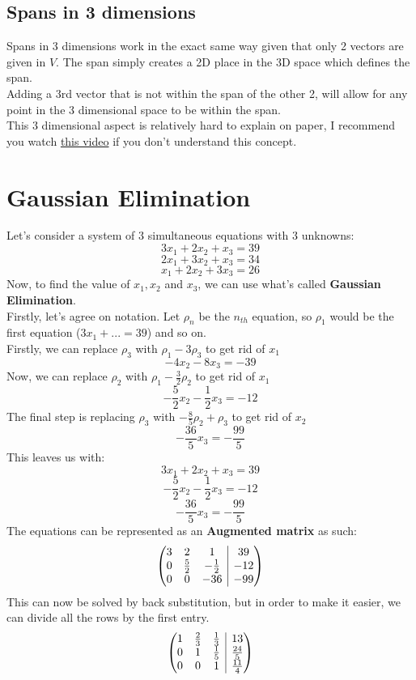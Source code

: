 \documentclass[table]{article}
\makeatletter
\theoremstyle{definition}
\newenvironment{amatrix}[1]{%
  \left(\begin{array}{@{}*{#1}{c}|c@{}}
}{%
  \end{array}\right)
}
\makeatother
\begin{document}
  \subsection{Spans in 3 dimensions}
  Spans in 3 dimensions work in the exact same way given that only 2 vectors are given in $V$. The span simply creates a 2D place in the 3D space which defines the span. \\
  Adding a 3rd vector that is not within the span of the other 2, will allow for any point in the 3 dimensional space to be within the span. \\
  This 3 dimensional aspect is relatively hard to explain on paper, I recommend you watch \href{https://youtu.be/k7RM-ot2NWY?t=357}{this video} if you don't understand this concept.

  \section{Gaussian Elimination}
  Let's consider a system of 3 simultaneous equations with 3 unknowns:
  \[3x_1+2x_2+x_3 = 39 \]
 \[2x_1+3x_2+x_3 = 34 \]
 \[x_1+2x_2+3x_3 = 26 \]
 Now, to find the value of $x_1, x_2$ and $x_3$, we can use what's called \textbf{Gaussian Elimination}. \\
 Firstly, let's agree on notation. Let $\rho_n$ be the $n_{th}$ equation, so $\rho_1$ would be the first equation ($3x_1 + ... = 39$) and so on. \\
  Firstly, we can replace $\rho_3$ with $\rho_1 - 3\rho_3$ to get rid of $x_1$
  \[
    -4x_2 - 8x_3 = -39
  \]
  Now, we can replace $\rho_2$ with $\rho_1 - \frac{3}{2} \rho_2$ to get rid of $x_1$
  \[
    -\frac{5}{2}x_2 - \frac{1}{2}x_3 = -12
  \]
  The final step is replacing $\rho_3$ with $-\frac{8}{5}\rho_2 + \rho_3$ to get rid of $x_2$
  \[
    -\frac{36}{5}x_3 = -\frac{99}{5}
  \]
  This leaves us with:
  \[ 3x_1+2x_2+x_3=39 \]
  \[-\frac{5}{2}x_2 - \frac{1}{2}x_3 = -12\]
\[
    -\frac{36}{5}x_3 = -\frac{99}{5}
  \]
  The equations can be represented as an \textbf{Augmented matrix} as such:
  \[
    \begin{amatrix}{3}
      3 & 2 & 1 & 39 \\
      0 & \frac{5}{2} & -\frac{1}{2} & -12 \\
      0 & 0 & -36 & -99 \\
    \end{amatrix}
  \]
  This can now be solved by back substitution, but in order to make it easier, we can divide all the rows by the first entry.
  \[\begin{amatrix}{3}
    1 & \frac{2}{3} & \frac{1}{3} & 13 \\
    0 & 1 & \frac{1}{5} & \frac{24}{5} \\
    0 & 0 & 1 & \frac{11}{4} \\
  \end{amatrix} \]
\end{document}
